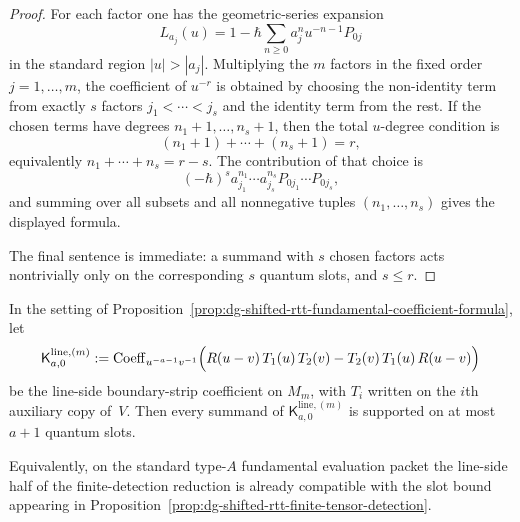 \begin{proof}
For each factor one has the geometric-series expansion
\[
L_{a_j}(u)
=
1-\hbar\sum_{n\ge0}a_j^n u^{-n-1}P_{0j}
\]
in the standard region $|u|>|a_j|$.  Multiplying the $m$ factors in the
fixed order $j=1,\dots,m$, the coefficient of $u^{-r}$ is obtained by
choosing the non-identity term from exactly $s$ factors
$j_1<\cdots<j_s$ and the identity term from the rest.  If the chosen
terms have degrees $n_1+1,\dots,n_s+1$, then the total $u$-degree
condition is
\[
(n_1+1)+\cdots+(n_s+1)=r,
\]
equivalently $n_1+\cdots+n_s=r-s$.  The contribution of that choice is
\[
(-\hbar)^s a_{j_1}^{n_1}\cdots a_{j_s}^{n_s}
P_{0j_1}\cdots P_{0j_s},
\]
and summing over all subsets and all nonnegative tuples
$(n_1,\dots,n_s)$ gives the displayed formula.

The final sentence is immediate: a summand with $s$ chosen factors
acts nontrivially only on the corresponding $s$ quantum slots, and
$s\le r$.
\end{proof}

\begin{corollary}
\label{cor:dg-shifted-rtt-boundary-support-bound}
In the setting of
Proposition~\ref{prop:dg-shifted-rtt-fundamental-coefficient-formula},
let
\[
\mathsf{K}^{\mathrm{line},(m)}_{a,0}
:=
\operatorname{Coeff}_{u^{-a-1}v^{-1}}
\Bigl(
R(u-v)\,T_1(u)\,T_2(v)-T_2(v)\,T_1(u)\,R(u-v)
\Bigr)
\]
be the line-side boundary-strip coefficient on $M_m$, with
$T_i$ written on the $i$th auxiliary copy of~$V$.  Then every summand
of $\mathsf{K}^{\mathrm{line},(m)}_{a,0}$ is supported on at most
$a+1$ quantum slots.

Equivalently, on the standard type-$A$ fundamental evaluation packet
the line-side half of the finite-detection reduction is already
compatible with the slot bound appearing in
Proposition~\ref{prop:dg-shifted-rtt-finite-tensor-detection}.
\end{corollary}

